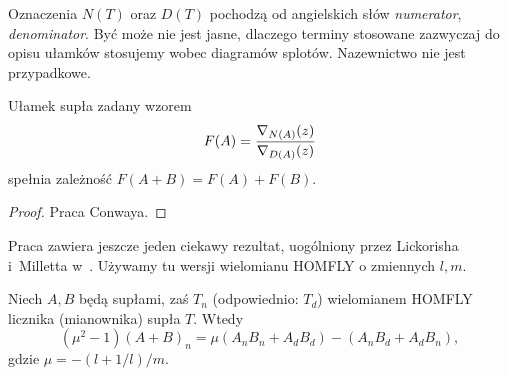 Oznaczenia $N(T)$ oraz $D(T)$ pochodzą od angielskich słów \emph{numerator}, \emph{denominator}.
Być może nie jest jasne, dlaczego terminy stosowane zazwyczaj do opisu ułamków stosujemy wobec diagramów splotów.
Nazewnictwo nie jest przypadkowe.

\begin{proposition}
%
    Ułamek supła zadany wzorem
    \begin{equation}
        F(A) = \frac{\nabla_{N(A)}(z)}{\nabla_{D(A)}(z)}
    \end{equation}
    spełnia zależność $F(A+B) = F(A) + F(B)$.
\end{proposition}

\begin{proof}
    Praca \cite{conway1970} Conwaya.
\end{proof}

Praca \cite{conway1970} zawiera jeszcze jeden ciekawy rezultat, uogólniony przez Lickorisha i~Milletta w~\cite[fakt 12]{lickorish1987}.
Używamy tu wersji wielomianu HOMFLY o zmiennych $l, m$.

\begin{proposition}
    Niech $A, B$ będą supłami, zaś $T_n$ (odpowiednio: $T_d$)  wielomianem HOMFLY licznika (mianownika) supła $T$.
    Wtedy
    \begin{equation}
        (\mu^2 - 1)(A+B)_n = \mu(A_nB_n + A_dB_d) - (A_nB_d + A_dB_n),
    \end{equation}
    gdzie $\mu = -(l + 1/l)/m$. %
\end{proposition}





%

